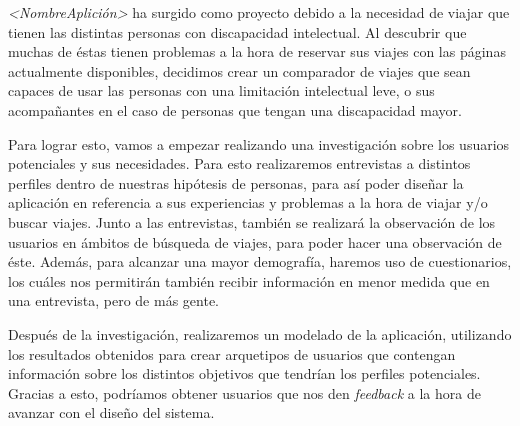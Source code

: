 
\textit{<NombreAplición>} ha surgido como proyecto debido a la necesidad de viajar que tienen las distintas personas con discapacidad intelectual. Al
descubrir que muchas de éstas tienen problemas a la hora de reservar sus viajes con las páginas actualmente disponibles, decidimos crear un 
comparador de viajes que sean capaces de usar las personas con una limitación intelectual leve, o sus acompañantes en el caso de personas que
tengan una discapacidad mayor. 

Para lograr esto, vamos a empezar realizando una investigación sobre los usuarios potenciales y sus necesidades. Para esto realizaremos entrevistas
a distintos perfiles dentro de nuestras hipótesis de personas, para así poder diseñar la aplicación en referencia a sus experiencias y problemas a la hora
de viajar y/o buscar viajes. Junto a las entrevistas, también se realizará la observación de los usuarios en ámbitos de búsqueda de viajes, para poder hacer
una observación de éste. Además, para alcanzar una mayor demografía, haremos uso de cuestionarios, los cuáles nos permitirán también recibir información
en menor medida que en una entrevista, pero de más gente.

Después de la investigación, realizaremos un modelado de la aplicación, utilizando los resultados obtenidos para crear arquetipos de usuarios que
contengan información sobre los distintos objetivos que tendrían los perfiles potenciales. Gracias a esto, podríamos obtener usuarios que nos den
\textit{feedback} a la hora de avanzar con el diseño del sistema.

